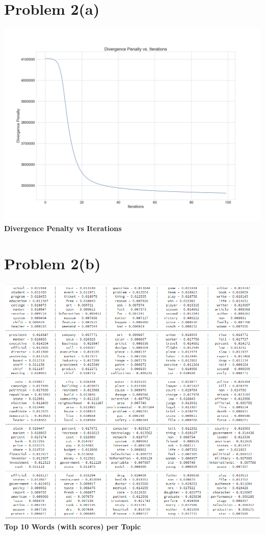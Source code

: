 \documentclass[openany,11pt]{homework}
\begin{document}
\section*{Problem 2(a)}

\begin{center}
	\centering
	\includegraphics[width = \textwidth]{2a.png}
	\textbf{Divergence Penalty vs Iterations}
\end{center}

\newpage

\section*{Problem 2(b)}

\begin{center}
	\centering
	\includegraphics[width = \textwidth]{topics.png}
	\\
	\textbf{Top 10 Words (with scores) per Topic}
\end{center}
\end{document}
